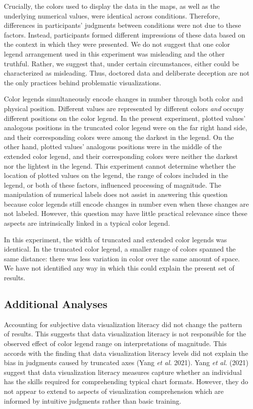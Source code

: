 \documentclass[
]{interact}
\begin{document}
Crucially, the colors used to display the data in the maps, as well as
the underlying numerical values, were identical across conditions.
Therefore, differences in participants' judgments between conditions
were not due to these factors. Instead, participants formed different
impressions of these data based on the context in which they were
presented. We do not suggest that one color legend arrangement used in
this experiment was misleading and the other truthful. Rather, we
suggest that, under certain circumstances, either could be characterized
as misleading. Thus, doctored data and deliberate deception are not the
only practices behind problematic visualizations.

Color legends simultaneously encode changes in number through both color
and physical position. Different values are represented by different
colors \emph{and} occupy different positions on the color legend. In the
present experiment, plotted values' analogous positions in the truncated
color legend were on the far right hand side, and their corresponding
colors were among the darkest in the legend. On the other hand, plotted
values' analogous positions were in the middle of the extended color
legend, and their corresponding colors were neither the darkest nor the
lightest in the legend. This experiment cannot determine whether the
location of plotted values on the legend, the range of colors included
in the legend, or both of these factors, influenced processing of
magnitude. The manipulation of numerical labels does not assist in
answering this question because color legends still encode changes in
number even when these changes are not labeled. However, this question
may have little practical relevance since these aspects are
intrinsically linked in a typical color legend.

In this experiment, the width of truncated and extended color legends
was identical. In the truncated color legend, a smaller range of colors
spanned the same distance: there was less variation in color over the
same amount of space. We have not identified any way in which this could
explain the present set of results.

\hypertarget{additional-analyses}{%
\subsection{Additional Analyses}\label{additional-analyses}}

Accounting for subjective data visualization literacy did not change the
pattern of results. This suggests that data visualization literacy is
not responsible for the observed effect of color legend range on
interpretations of magnitude. This accords with the finding that data
visualization literacy levels did not explain the bias in judgments
caused by truncated axes (Yang \emph{et al.} 2021). Yang \emph{et al.}
(2021) suggest that data visualization literacy measures capture whether
an individual has the skills required for comprehending typical chart
formats. However, they do not appear to extend to aspects of
visualization comprehension which are informed by intuitive judgments
rather than basic training.
\end{document}
